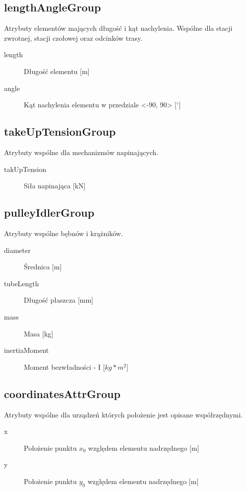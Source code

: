 \documentclass[12pt,a4paper]{article}
\begin{document}
\subsection{lengthAngleGroup}
Atrybuty elementów mających długość i kąt nachylenia. Wspólne dla stacji
zwrotnej, stacji czołowej oraz odcinków trasy.

\begin{description}
\item[length] Długość elementu [m]
\item[angle] Kąt nachylenia elementu w przedziale <-90, 90> [$^\circ$] 
\end{description}

\subsection{takeUpTensionGroup}
Atrybuty wspólne dla mechanizmów napinających.

\begin{description}
\item[takUpTension] Siła napinająca [kN]
\end{description}

\subsection{pulleyIdlerGroup}
Atrybuty wspólne bębnów i krążników.

\begin{description}
\item[diameter] Średnica [m]
\item[tubeLength] Długość płaszcza [mm]
\item[mass] Masa [kg]
\item[inertiaMoment] Moment bezwładności - I [$kg*m^2$]
\end{description}

\subsection{coordinatesAttrGroup}
Atrybuty wspólne dla urządzeń których położenie jest opisane współrzędnymi.

\begin{description}
\item[x] Położenie punktu $x_0$ względem elementu nadrzędnego [m]
\item[y] Położenie punktu $y_0$ względem elementu nadrzędnego [m]
\end{description}
\end{document}
